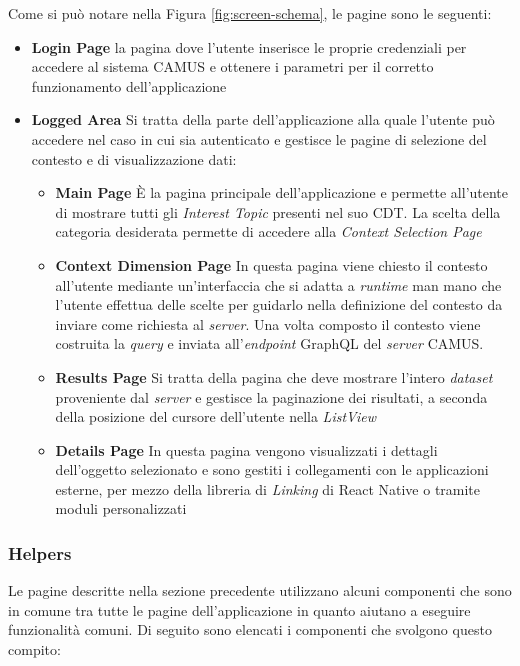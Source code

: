 Come si può notare nella Figura \ref{fig:screen-schema}, le pagine sono le seguenti:

\begin{itemize}
	\item \textbf{Login Page}
	\upe la pagina dove l'utente inserisce le proprie credenziali per accedere al sistema CAMUS e ottenere i parametri per il corretto funzionamento dell'applicazione
	\item \textbf{Logged Area}
	Si tratta della parte dell'applicazione alla quale l'utente può accedere nel caso in cui sia autenticato e gestisce le pagine di selezione del contesto e di visualizzazione dati:
	\begin{itemize}
		\item \textbf{Main Page}
		È la pagina principale dell'applicazione e permette all'utente di mostrare tutti gli \emph{Interest Topic} presenti nel suo CDT. La scelta della categoria desiderata permette di accedere alla \emph{Context Selection Page}
		\item \textbf{Context Dimension Page}
		In questa pagina viene chiesto il contesto all'utente mediante un'interfaccia che si adatta a \emph{runtime} man mano che l'utente effettua delle scelte per guidarlo nella definizione del contesto da inviare come richiesta al \emph{server}. Una volta composto il contesto viene costruita la \emph{query} e inviata all'\emph{endpoint} GraphQL del \emph{server} CAMUS. 
		\item \textbf{Results Page}
		Si tratta della pagina che deve mostrare l'intero \emph{dataset} proveniente dal \emph{server} e gestisce la paginazione dei risultati, a seconda della posizione del cursore dell'utente nella \emph{ListView} 
		\item \textbf{Details Page}
		In questa pagina vengono visualizzati i dettagli dell'oggetto selezionato e sono gestiti i collegamenti con le applicazioni esterne, per mezzo della libreria di \emph{Linking} di React Native o tramite moduli personalizzati
	\end{itemize}
\end{itemize}

\subsubsection{Helpers}

Le pagine descritte nella sezione precedente utilizzano alcuni componenti che sono in comune tra tutte le pagine dell'applicazione in quanto aiutano a eseguire funzionalità comuni. Di seguito sono elencati i componenti che svolgono questo compito:

